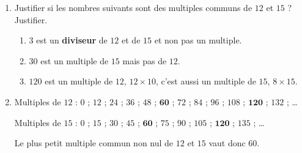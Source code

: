     \begin{enumerate}
        \item Justifier si les nombres suivants sont des multiples communs de $12$ et $15$ ? Justifier.

        \begin{enumerate}
            \item $3$ est un \textbf{diviseur} de $12$ et de $15$ et non pas un multiple.
            \item $30$ est un multiple de $15$ mais pas de $12$.
            \item $120$ est un multiple de $12$, $12\times 10$, c'est aussi un multiple de $15$, $8\times 15$.
        \end{enumerate}
        \setcounter{enumi}{1}
        \item Multiples de $12$ : \sout{$0$} ; $12$ ; $24$ ; $36$ ; $48$ ; $\mathbf{60}$ ; $72$ ; $84$ ; $96$ ; $108$ ; $\mathbf{120}$ ; $132$ ; \dots

        Multiples de $15$ : \sout{$0$} ; $15$ ; $30$ ; $45$ ; $\mathbf{60}$ ; $75$ ; $90$ ; $105$ ; $\mathbf{120}$ ; $135$ ; \dots

        Le plus petit multiple commun non nul de $12$ et $15$ vaut donc $60$.
    \end{enumerate}
